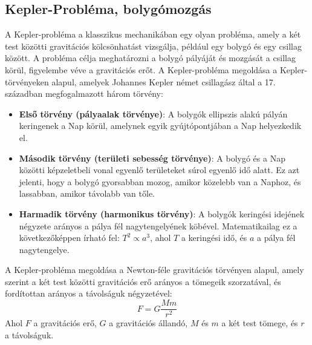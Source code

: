\documentclass[a4paper,12pt]{article}
\begin{document}
\subsection{Kepler-Probléma, bolygómozgás}
A Kepler-probléma a klasszikus mechanikában egy olyan probléma, amely a két test közötti gravitációs kölcsönhatást vizsgálja, például egy bolygó és egy csillag között. A probléma célja meghatározni a bolygó pályáját és mozgását a csillag körül,
figyelembe véve a gravitációs erőt. A Kepler-probléma megoldása a Kepler-törvényeken alapul, amelyek Johannes Kepler német csillagász által a 17. században megfogalmazott három törvény:
\begin{itemize}
    \item \textbf{Első törvény (pályaalak törvénye)}: A bolygók ellipszis alakú pályán keringenek a Nap körül, amelynek egyik gyújtópontjában a Nap helyezkedik el.
    \item \textbf{Második törvény (területi sebesség törvénye)}: A bolygó és a Nap közötti képzeletbeli vonal egyenlő területeket súrol egyenlő idő alatt. Ez azt jelenti, hogy a bolygó gyorsabban mozog, amikor közelebb van a Naphoz, és lassabban, amikor távolabb van tőle.
    \item \textbf{Harmadik törvény (harmonikus törvény)}: A bolygók keringési idejének négyzete arányos a pálya fél nagytengelyének köbével. Matematikailag ez a következőképpen írható fel: $T^2 \propto a^3$, ahol $T$ a keringési idő, és $a$ a pálya fél nagytengelye.
\end{itemize}
A Kepler-probléma megoldása a Newton-féle gravitációs törvényen alapul, amely szerint a két test közötti gravitációs erő arányos a tömegeik szorzatával, és fordítottan arányos a távolságuk négyzetével:
\begin{equation}
    F = G \frac{M m}{r^2}
\end{equation}
Ahol $F$ a gravitációs erő, $G$ a gravitációs állandó, $M$ és $m$ a két test tömege, és $r$ a távolságuk. 
\end{document}

